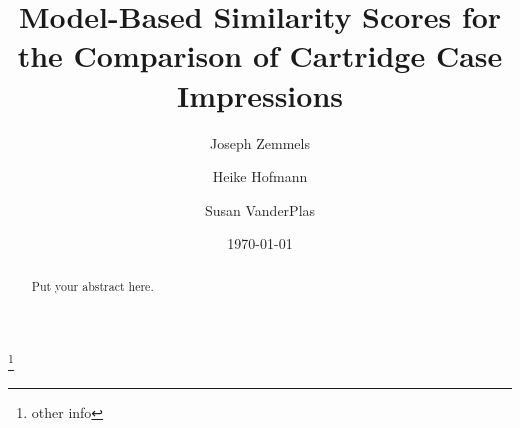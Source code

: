 \documentclass[preprint]{JASA}
\begin{document}

\title[]{Model-Based Similarity Scores for the Comparison of Cartridge
Case Impressions}



\author{Joseph Zemmels}
\thanks{other info}
\author{Heike Hofmann}


\author{Susan VanderPlas}






\date{\today}

\begin{abstract}
Put your abstract here.
\end{abstract}


\maketitle
\end{document}
